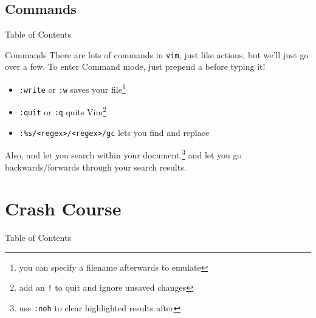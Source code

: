 \documentclass{beamer}
\begin{document}
\subsection{Commands}
\begin{frame}{Table of Contents}
	\tableofcontents[currentsubsection]
\end{frame}

\begin{frame}{Commands}
	There are lots of commands in \texttt{vim}, just like actions, but we'll
	just go over a few. To enter Command mode, just prepend a \keys{:}
	before typing it!
	\pause

	\begin{itemize}
		\item \texttt{:write} or \texttt{:w} saves your
			file\footnote{you can specify a filename afterwards to
			emulate }
			\pause

		\item \texttt{:quit} or \texttt{:q} quits Vim\footnote{add an
			\texttt{!} to quit and ignore unsaved changes}
			\pause

		\item \texttt{:\%s/<regex>/<regex>/gc} lets you find and replace
	\end{itemize}
	\pause

	Also, \keys{\textbackslash} and  let you search within your
	document.\footnote{use \texttt{:noh} to clear highlighted results after}
	 and  let you go backwards/forwards through your search
	results.
\end{frame}

\section{Crash Course}
\begin{frame}{Table of Contents}
	\tableofcontents[currentsection]
\end{frame}
\end{document}
